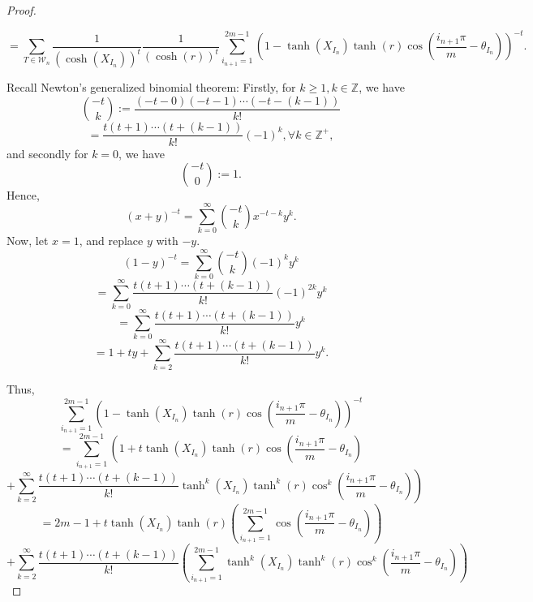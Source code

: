 \documentclass[12pt,oneside]{sfsuthesis}
\theoremstyle{plain} %
\theoremstyle{definition}  %
\theoremstyle{remark}  %
\theoremstyle{plain}
\begin{document}
{\begin{proof}
\begin{small}
$$=\sum_{T\in\mathcal{W}_n}\frac{1}{\left(\cosh\left(X_{I_{n}}\right)\right)^t}\frac{1}{\left(\cosh\left(r\right)\right)^t}\sum_{i_{n+1}=1}^{2m-1}\left(1-\tanh\left(X_{I_n}\right)\tanh\left(r\right)\cos\left(\frac{i_{n+1}\pi}{m}-\theta_{I_{n}}\right)\right)^{-t}.
$$
\end{small}
Recall Newton's generalized binomial theorem: Firstly, for $k\geq 1,k\in\mathbb{Z}$, we have
$$
\binom{-t}{k}:=\frac{\left(-t-0\right)\left(-t-1\right)\cdots \left(-t-\left(k-1\right)\right)}{k!}
$$
$$
=\frac{t\left(t+1\right)\cdots\left(t+\left(k-1\right)\right)}{k!}\left(-1\right)^k, \forall k \in\mathbb{Z}^{+},
$$
and secondly for $k=0$, we have
$$
\binom{-t}{0}:=1.
$$
Hence, 
$$
\left(x+y \right)^{-t}=\sum_{k=0}^\infty \binom{-t}{k} x^{-t-k}y^k.
$$
Now, let $x=1$, and replace $y$ with $-y$.
$$
\left(1-y \right)^{-t}=\sum_{k=0}^\infty \binom{-t}{k} \left(-1\right)^k y^k
$$
$$
=\sum_{k=0}^\infty \frac{t\left(t+1\right)\cdots\left(t+\left(k-1\right)\right)}{k!} \left(-1\right)^{2k} y^k
$$
$$ = \sum_{k=0}^\infty \frac{t\left(t+1\right)\cdots\left(t+\left(k-1\right)\right)}{k!}   y^k
$$
$$
=1+ty+\sum_{k=2}^\infty \frac{t\left(t+1\right)\cdots\left(t+\left(k-1\right)\right)}{k!} y^k.
$$

Thus, 
$$
\sum_{i_{n+1}=1}^{2m-1}\left(1-\tanh\left(X_{I_n}\right)\tanh\left(r\right)\cos\left(\frac{i_{n+1}\pi}{m}-\theta_{I_{n}}\right)\right)^{-t}
$$
$$
=\sum_{i_{n+1}=1}^{2m-1}\left( 1+t\tanh\left( X_{I_n}\right)\tanh\left(r \right)\cos \left(\frac{i_{n+1} \pi}{m}-\theta_{I_n} \right)\right.
$$
$$
\left.
+\sum_{k=2}^{\infty}\frac{t\left(t+1\right)\cdots\left(t+\left(k-1\right)\right)}{k!}\tanh^k\left(X_{I_n}\right)\tanh^k\left(r\right)\cos^k\left(\frac{i_{n+1}\pi}{m}-\theta_{I_{n}}\right)
\right)
$$
$$
=2m-1+t\tanh\left(X_{I_n} \right)\tanh\left(r\right)\left(\sum_{i_{n+1}=1}^{2m-1}\cos\left(\frac{i_{n+1}\pi}{m}-\theta_{I_n}\right) \right)
$$
$$
+\sum_{k=2}^{\infty}\frac{t\left(t+1\right)\cdots\left(t+\left(k-1\right)\right)}{k!}
\left(\sum_{i_{n+1}=1}^{2m-1} 
\tanh^k\left(X_{I_n}\right)\tanh^k\left(r\right)\cos^k\left(\frac{i_{n+1}\pi}{m}-\theta_{I_{n}}\right)
\right)
$$


\end{proof}}
\end{document}
